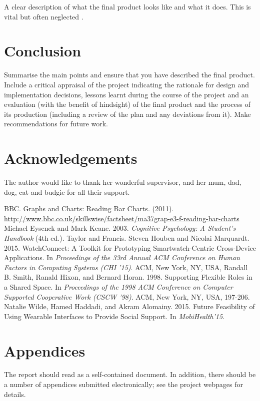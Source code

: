 \documentclass[twocolumn]{article}
\begin{document}
A clear description of what the final product looks like and what it does. This is vital but often neglected \cite{Smith}.


\section{Conclusion}
\vspace{-1ex}

Summarise the main points and ensure that you have described the final product. Include a critical appraisal of the project indicating the rationale for design and implementation decisions, lessons learnt during the course of the project and an evaluation (with the benefit of hindsight) of the final product and the process of its production (including a review of the plan and any deviations from it). Make recommendations for future work.


\section*{Acknowledgements}
\vspace{-1ex}

The author would like to thank her wonderful supervisor, and her mum, dad, dog, cat and budgie for all their support.

%

\begin{thebibliography}{9}
%
BBC. Graphs and Charts: Reading Bar Charts. (2011).\\
\url{http://www.bbc.co.uk/skillswise/factsheet/ma37grap-e3-f-reading-bar-charts}
%
Michael Eysenck and Mark Keane. 2003. \textit{Cognitive Psychology: A
Student's Handbook} (4th ed.). Taylor and Francis.
%
Steven Houben and Nicolai Marquardt. 2015. WatchConnect: A Toolkit for
Prototyping Smartwatch-Centric Cross-Device Applications. In
\textit{Proceedings of the 33rd Annual ACM Conference on Human Factors in
Computing Systems (CHI '15)}. ACM, New York, NY, USA,
%
Randall B. Smith, Ranald Hixon, and Bernard Horan. 1998. Supporting
Flexible Roles in a Shared Space. In \textit{Proceedings of the 1998 ACM
Conference on Computer Supported Cooperative Work (CSCW '98)}. ACM,
New York, NY, USA, 197­-206.
%
Natalie Wilde, Hamed Haddadi, and Akram Alomainy. 2015. Future
Feasibility of Using Wearable Interfaces to Provide Social Support. In
\textit{MobiHealth'15}.
%
\end{thebibliography}


\section*{Appendices}
\vspace{-1ex}

The report should read as a self-contained document. In addition, there should be a number of appendices submitted electronically; see the project webpages for details.

\end{document}
